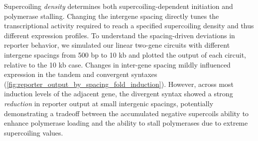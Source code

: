 \documentclass[11pt]{article}
\begin{document}
Supercoiling \emph{density} determines both supercoiling-dependent initiation and polymerase stalling. Changing the intergene spacing directly tunes the transcriptional activity required to reach a specified supercoiling density and thus different expression profiles. To understand the spacing-driven deviations in reporter behavior, we simulated our linear two-gene circuits with different intergene spacings from 500 bp to 10 kb and plotted the output of each circuit, relative to the 10 kb case. Changes in inter-gene spacing mildly influenced expression in the tandem and convergent syntaxes (\cref{fig:reporter_output_by_spacing_fold_induction}). However, across most induction levels of the adjacent gene, the divergent syntax showed a strong \emph{reduction} in reporter output at small intergenic spacings, potentially demonstrating a tradeoff between the accumulated negative supercoils ability to enhance polymerase loading and the ability to stall polymerases due to extreme supercoiling values.
\end{document}
